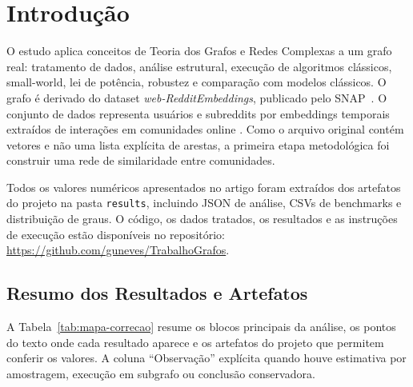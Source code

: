 \documentclass[sigconf]{webmedia}
\begin{document}
\section{Introdução}

O estudo aplica conceitos de Teoria dos Grafos e Redes Complexas a
um grafo real: tratamento de dados, análise estrutural, execução de
algoritmos clássicos, small-world, lei de potência, robustez e
comparação com modelos clássicos. O grafo é derivado do dataset
\textit{web-RedditEmbeddings}, publicado pelo SNAP~\cite{snapredditembeddings}.
O conjunto de dados representa usuários e subreddits por embeddings
temporais extraídos de interações em comunidades online
\cite{kumar2019predicting,kumar2018community}. Como o arquivo original
contém vetores e não uma lista explícita de arestas, a primeira etapa
metodológica foi construir uma rede de similaridade entre comunidades.

Todos os valores numéricos apresentados no artigo foram extraídos dos
artefatos do projeto na pasta \texttt{results}, incluindo JSON de
análise, CSVs de benchmarks e distribuição de graus. O código, os dados
tratados,
os resultados e as instruções de execução estão disponíveis no
repositório:
\url{https://github.com/guneves/TrabalhoGrafos}.

\subsection*{Resumo dos Resultados e Artefatos}

A Tabela~\ref{tab:mapa-correcao} resume os blocos principais da análise,
os pontos do texto onde cada resultado aparece e os artefatos do projeto
que permitem conferir os valores. A coluna ``Observação'' explícita
quando houve estimativa por amostragem, execução em subgrafo ou
conclusão conservadora.
\end{document}
